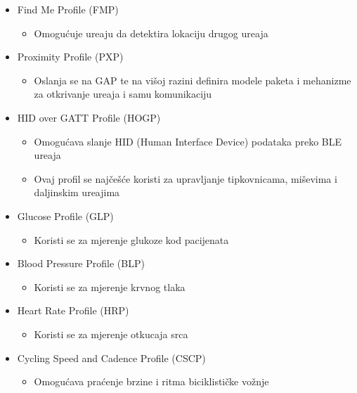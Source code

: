 \begin{itemize}
	\item Find Me Profile (FMP)
	\begin{itemize}
		\item Omogu\'{c}uje ure\dj aju da detektira lokaciju drugog ure\dj aja
	\end{itemize}
	
	\item Proximity Profile (PXP)
	\begin{itemize}
		\item Oslanja se na GAP te na vi\v{s}oj razini definira modele paketa i mehanizme za otkrivanje ure\dj aja i samu komunikaciju
	\end{itemize}
	
	\item HID over GATT Profile (HOGP)
	\begin{itemize}
		\item Omogu\'{c}ava slanje HID (Human Interface Device) podataka preko BLE ure\dj aja
		\item Ovaj profil se naj\v{c}e\v{s}\'{c}e koristi za upravljanje tipkovnicama, mi\v{s}evima i daljinskim ure\dj ajima
	\end{itemize}
	
	\item Glucose Profile (GLP)
	\begin{itemize}
		\item Koristi se za mjerenje glukoze kod pacijenata
	\end{itemize}
	
	\item Blood Pressure Profile (BLP)
	\begin{itemize}
		\item Koristi se za mjerenje krvnog tlaka
	\end{itemize}
	
	\item Heart Rate Profile (HRP)
	\begin{itemize}
		\item Koristi se za mjerenje otkucaja srca
	\end{itemize}
	
	\item Cycling Speed and Cadence Profile (CSCP)
	\begin{itemize}
		\item Omogu\'{c}ava pra\'{c}enje brzine i ritma biciklisti\v{c}ke vo\v{z}nje
	\end{itemize}
\end{itemize}


